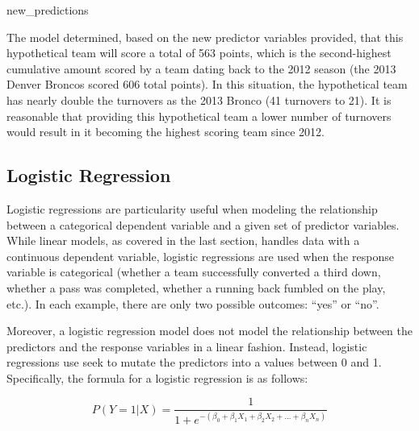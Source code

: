\documentclass[
  letterpaper,
]{krantz}
\newenvironment{Shaded}{\begin{snugshade}}{\end{snugshade}}
\newcommand{\NormalTok}[1]{\textcolor[rgb]{0.00,0.23,0.31}{#1}}
\begin{document}
\begin{tcolorbox}
\begin{Shaded}
\begin{Highlighting}[]
\NormalTok{new\_predictions}
\end{Highlighting}
\end{Shaded}

The model determined, based on the new predictor variables provided,
that this hypothetical team will score a total of 563 points, which is
the second-highest cumulative amount scored by a team dating back to the
2012 season (the 2013 Denver Broncos scored 606 total points). In this
situation, the hypothetical team has nearly double the turnovers as the
2013 Bronco (41 turnovers to 21). It is reasonable that providing this
hypothetical team a lower number of turnovers would result in it
becoming the highest scoring team since 2012.

\end{tcolorbox}

\hypertarget{logistic-regression}{%
\subsection{Logistic Regression}\label{logistic-regression}}

Logistic regressions are particularity useful when modeling the
relationship between a categorical dependent variable and a given set of
predictor variables. While linear models, as covered in the last
section, handles data with a continuous dependent variable, logistic
regressions are used when the response variable is categorical (whether
a team successfully converted a third down, whether a pass was
completed, whether a running back fumbled on the play, etc.). In each
example, there are only two possible outcomes: ``yes'' or ``no''.

Moreover, a logistic regression model does not model the relationship
between the predictors and the response variables in a linear fashion.
Instead, logistic regressions use seek to mutate the predictors into a
values between 0 and 1. Specifically, the formula for a logistic
regression is as follows:

\[
P(Y=1|X) = \frac{1}{1 + e^{-(\beta_0 + \beta_1X_1 + \beta_2X_2 + ... + \beta_nX_n)}}
\]
\end{document}
